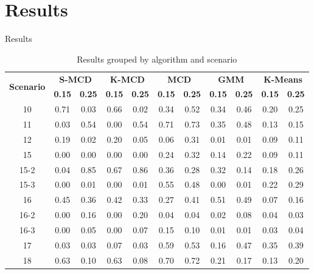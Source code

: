 \documentclass[newPxFont, numfooter, sectionpages]{beamer}
\begin{document}
\section{Results}

\begin{frame}[c]{Results}
	\begin{table}[h!]
	  \centering
	  \scriptsize
	  \caption{Results grouped by algorithm and scenario}
	  \label{tab:tab02}
	  \begin{tabular}{ c|c c|c c|c c|c c|c c }
		\toprule
		\multirow{2}{*}{\textbf{Scenario}}   &\multicolumn{2}{c}{\textbf{S-MCD}} &\multicolumn{2}{c}{\textbf{K-MCD}} &\multicolumn{2}{c}{\textbf{MCD}} &\multicolumn{2}{c}{\textbf{GMM}} &\multicolumn{2}{c}{\textbf{K-Means}}\\ 
				\hhline{~----------}
				&\textbf{0.15} &\textbf{0.25} &\textbf{0.15} &\textbf{0.25} &\textbf{0.15} &\textbf{0.25} &\textbf{0.15} &\textbf{0.25} &\textbf{0.15} &\textbf{0.25}\\
		\midrule
			10 &\color{red} 0.71 & 0.03 & 0.66 & 0.02 & 0.34 & 0.52 & 0.34 & 0.46 & 0.20 & 0.25 \\ \hline
			11 & 0.03 & 0.54 & 0.00 & 0.54 & 0.71 &\color{red} 0.73 & 0.35 & 0.48 & 0.13 & 0.15 \\ \hline
			12 & 0.19 & 0.02 & 0.20 & 0.05 & 0.06 &\color{red} 0.31 & 0.01 & 0.01 & 0.09 & 0.11 \\ \hline
			15 & 0.00 & 0.00 & 0.00 & 0.00 & 0.24 &\color{red} 0.32 & 0.14 & 0.22 & 0.09 & 0.11 \\ \hline
			15-2 & 0.04 & 0.85 & 0.67 &\color{red} 0.86 & 0.36 & 0.28 & 0.32 & 0.14 & 0.18 & 0.26 \\ \hline
			15-3 & 0.00 & 0.01 & 0.00 & 0.01 &\color{red} 0.55 & 0.48 & 0.00 & 0.01 & 0.22 & 0.29 \\ \hline
			16 & 0.45 & 0.36 & 0.42 & 0.33 & 0.27 & 0.41 &\color{red} 0.51 & 0.49 & 0.07 & 0.16 \\ \hline
			16-2 & 0.00 & 0.16 & 0.00 &\color{red} 0.20 & 0.04 & 0.04 & 0.02 & 0.08 & 0.04 & 0.03 \\ \hline
			16-3 & 0.00 & 0.05 & 0.00 & 0.07 &\color{red} 0.15 & 0.10 & 0.01 & 0.01 & 0.03 & 0.04 \\ \hline
			17 & 0.03 & 0.03 & 0.07 & 0.03 &\color{red} 0.59 & 0.53 & 0.16 & 0.47 & 0.35 & 0.39 \\ \hline
			18 & 0.63 & 0.10 & 0.63 & 0.08 & 0.70 &\color{red} 0.72 & 0.21 & 0.17 & 0.13 & 0.20 \\ \hline

\end{tabular}
\end{table}
\end{frame}
\end{document}
